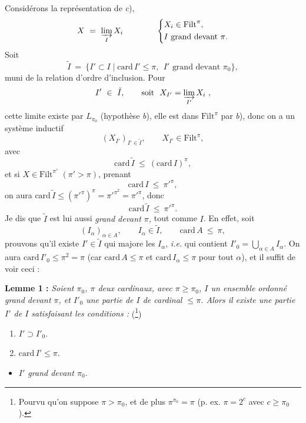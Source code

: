 \documentclass[11pt]{article}
\newcommand{\printedpage}[1]{\marginpar{\footnotesize p.~#1}}
\newcommand{\msp}[1]{\marginpar{\footnotesize [#1]}}
\newcommand{\Filt}{\mathrm{Filt}}
\newcommand{\card}{\mathrm{card}\,}
\begin{document}
Considérons la représentation de \textit{c}),
\[
X \ = \ \varinjlim_{I} X_i \qquad\qquad
\left\{
\begin{aligned}
& X_i \in \Filt^{\pi},\\
& I \text{ grand devant } \pi.
\end{aligned}
\right.
\]
Soit
\[
\tilde{I} \ = \ \{I' \subset I \mid \card I' \leq \pi,\ \ I' \text{ grand devant } \pi_0\},
\]
muni de la relation d'ordre d'inclusion. Pour
\[
I' \ \in\ \tilde{I}, \qquad \text{soit}\ \ X_{I'} = \varinjlim_{I'} X_i\ ,
\]
cette limite existe par $L_{\pi_0}$ (hypothèse \textit{b}), elle est dans $\Filt^{\pi}$ par \textit{b}), donc on a un système inductif
\[
(X_{I'})_{I' \in \tilde{I}}, \qquad X_{I'} \in \Filt^{\pi},
\]
avec
\[
\card \tilde{I} \ \leq\ (\card I)^{\pi},
\]
et si $X \in \Filt^{\pi'}$ $(\pi' > \pi)$, prenant
\[
\card I \ \leq\ \pi'^{\pi},
\]
on aura $\card \tilde{I} \leq (\pi'^{\pi})^{\pi} = \pi'^{\pi^2} = \pi'^{\pi}$, donc
\[
\card \tilde{I} \ \leq\ \pi'^{\pi}.
\]
Je dis que $\tilde{I}$ est lui aussi \textit{grand devant $\pi$,} tout comme $I$. En effet,
\msp{page 80}
soit
\[
(I_\alpha)_{\alpha \in A}, \qquad I_\alpha \in \tilde{I}, \qquad \card A \ \leq\ \pi,
\]
prouvons qu'il existe $I' \in \tilde{I}$ qui majore les $I_\alpha$, \textit{i.e.} qui contient $I'_0 = \bigcup_{\alpha \in A} I_\alpha$. On aura $\card I'_0 \leq \pi^2 = \pi$ (car $\card A \leq \pi$ et $\card I_\alpha \leq \pi$ pour tout $\alpha$), et il suffit de voir ceci :



\textbf{Lemme 1 :} \textit{Soient $\pi_0$, $\pi$ deux cardinaux, avec $\pi \geq \pi_0$, $I$ un ensemble ordonné grand devant $\pi$, et $I'_0$ une partie de $I$ de cardinal $\leq \pi$. Alors il existe une partie $I'$ de $I$ satisfaisant les conditions :} (\footnote[40]{Pourvu qu'on suppose $\pi > \pi_0$, et de plus $\pi^{\pi_0} = \pi$ (p. ex. $\pi = 2^c$ avec $c \geq \pi_0$).})

\begin{enumerate}
\item[a)] $I' \supset I'_0$.
\item[b)] $\card I' \leq \pi$.
\end{enumerate}

\printedpage{44}

\begin{itemize}
\item[c)] \textit{$I'$ grand devant $\pi_0$.}
\end{itemize}
\end{document}
